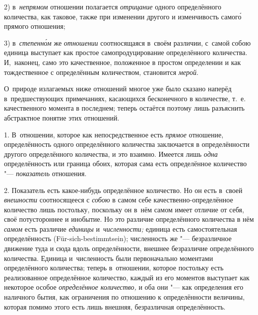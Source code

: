 2) в~{\em непрямом} отношении полагается {\em отрицание} одного определённого
количества, как таковое, также при изменении другого и изменчивость самог\'{о}
прямого отношения;

3) в~{\em степенн\'{о}м} же {\em отношении} соотносящаяся в~своём различии,
с~самой собою единица выступает как простое самопродуцирование определённого
количества. И,~наконец, само это качественное, положенное в простом определении
и как тождественное с определённым количеством, становится {\em мерой}.

О~природе излагаемых ниже отношений многое уже было сказано наперёд
в~предшествующих примечаниях, касающихся бесконечного в количестве, т.~е.
качественного момента в последнем; теперь остаётся поэтому лишь разъяснить
абстрактное понятие этих отношений.


1. В~отношении, которое как непосредственное есть {\em прямое} отношение,
определённость одного определённого количества заключается в определённости
другого определённого количества, и это взаимно. Имеется лишь {\em одна}
определённость или граница обоих, которая сама есть определённое количество
"--- {\em показатель} отношения.

2. Показатель есть какое-нибудь определённое количество. Но он есть в~своей
{\em внешности} соотносящееся с {\em собою} в самом себе
качественно-определённое количество лишь постольку, поскольку он в~нём самом
имеет отличие от себя, своё потустороннее и инобытие. Но это различие
определённого количества в нём {\em самом} есть различие {\em единицы}
и~{\em численности;} единица есть самостоятельная определённость
(Für-sich-bestimmt\-sein); численность же "--- безразличное движение туда и
сюда вдоль определённости, внешнее безразличие определённого количества.
Единица и~численность были первоначально моментами определённого количества;
теперь в~отношении, которое постольку есть реализованное определённое
количество, каждый из его моментов выступает как некоторое особое
{\em определённое количество,} и оба они "--- как определения его наличного
бытия, как ограничения по отношению к определённости величины, которая помимо
этого есть лишь внешняя, безразличная определённость.

